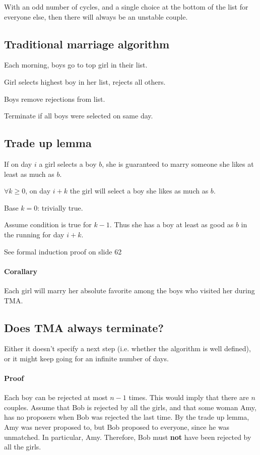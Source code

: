 \documentclass[a4paper]{article}
\newenvironment{enumerate*}%
  {\begin{enumerate}%
    \setlength{\itemsep}{0.5pt}%
    \setlength{\parsep}{0pt}%
    \setlength{\parskip}{0pt}}%
  {\end{enumerate}}
\begin{document}
With an odd number of cycles, and a single choice at the bottom of the list for everyone else, then there will always be an unstable couple.

\subsection{Traditional marriage algorithm}

\begin{enumerate*}
\item Each morning, boys go to top girl in their list.
\item Girl selects highest boy in her list, rejects all others.
\item Boys remove rejections from list.
\item Terminate if all boys were selected on same day.
\end{enumerate*}

\subsection{Trade up lemma}
If on day $i$ a girl selects a boy $b$, she is guaranteed to marry someone she likes at least as much as $b$.

$\forall k \ge 0$, on day $i+k$ the girl will select a boy she likes as much as $b$.

Base $k=0$: trivially true.

Assume condition is true for $k-1$. Thus she has a boy at least as good as $b$ in the running for day $i+k$.

See formal induction proof on slide 62

\paragraph{Corallary}
Each girl will marry her absolute favorite among the boys who visited her during TMA.

\subsection{Does TMA always terminate?}
Either it doesn't specify a next step (i.e. whether the algorithm is well defined), or it might keep going for an infinite number of days.

\paragraph{Proof}
Each boy can be rejected at most $n-1$ times. This would imply that there are $n$ couples. Assume that Bob is rejected by all the girls, and that some woman Amy, has no proposers when Bob was rejected the last time. By the trade up lemma, Amy was never proposed to, but Bob proposed to everyone, since he was unmatched. In particular, Amy. Therefore, Bob must {\bf not} have been rejected by all the girls.
\end{document}
